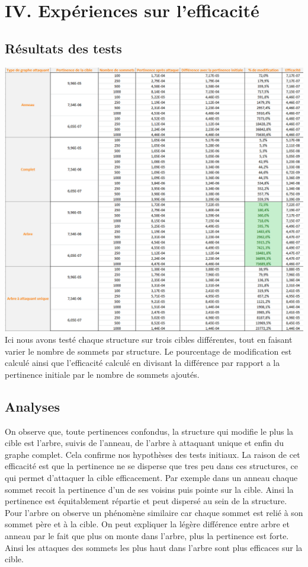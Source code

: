 \documentclass[a4paper,11pt]{article}
\begin{document}
\section{IV.	Expériences sur l'efficacité}
	
	\subsection{Résultats des tests}
		\includegraphics[scale = 0.5]{Captures/ranking5.PNG}\\
		Ici nous avons testé chaque structure sur trois cibles différentes, tout en faisant varier le nombre de sommets par structure. 
		Le pourcentage de modification est calculé ainsi que l'efficacité calculé en divisant la différence par rapport a la pertinence initiale par le nombre de sommets ajoutés.\\
	\subsection{Analyses}
		On observe que, toute pertinences confondus, la structure qui modifie le plus la cible est l'arbre, suivis de l'anneau, de l'arbre à attaquant unique et enfin du graphe complet.
		Cela confirme nos hypothèses des tests initiaux. La raison de cet efficacité est que la pertinence ne se disperse que tres peu dans ces structures, ce qui permet d'attaquer 
		la cible efficacement. Par exemple dans un anneau chaque sommet recoit la pertinence d'un de ses voisins puis pointe sur la cible. Ainsi la pertinence est équitablement répartie et peut dispersé au sein de la structure.
		Pour l'arbre on observe un phénomène similaire car chaque sommet est relié à son sommet père et à la cible. On peut expliquer la légère différence entre arbre et anneau par le fait 
		que plus on monte dans l'arbre, plus la pertinence est forte. Ainsi les attaques des sommets les plus haut dans l'arbre sont plus efficaces sur la cible.\\
		
\end{document}
